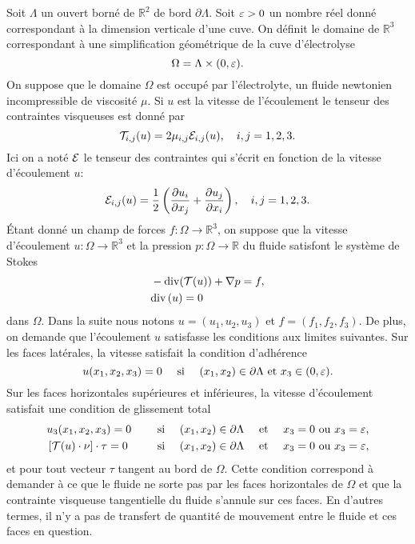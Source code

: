 Soit $\Lambda$ un ouvert borné de $\mathbb R^2$ de bord
$\partial\Lambda$. Soit $\varepsilon > 0$ un nombre réel donné
correspondant à la dimension verticale d'une cuve. On définit le
domaine de $\mathbb R^3$ correspondant à une simplification
géométrique de la cuve d'électrolyse
\begin{equation}
  \Omega = \Lambda \times (0,\varepsilon).
\end{equation}
On suppose que le domaine $\Omega$ est occupé par l'électrolyte, un
fluide newtonien incompressible de viscosité $\mu$. Si $u$ est la
vitesse de l'écoulement le tenseur des contraintes visqueuses
\cite{Landau1987} est donné par
\begin{equation}
  \mathcal T_{i,j}(u) = 2\mu_{i,j}
  \mathcal E_{i,j}(u),\quad i,j = 1,2,3.
\end{equation}
Ici on a noté $\mathcal E$ le tenseur des contraintes qui s'écrit
en fonction de la vitesse d'écoulement $u$:
\begin{equation}
  \mathcal E_{i,j}(u) = \frac{1}{2}\left( \frac{\partial u_i}{\partial x_j} + \frac{\partial u_j}{\partial x_i} \right),\quad i,j = 1,2,3.
\end{equation}
Étant donné un champ de forces $f:\Omega\to \mathbb R^3$, on suppose
que la vitesse d'écoulement $u:\Omega \to \mathbb R^3$ et la pression
$p:\Omega \to \mathbb R$ du fluide satisfont le système de Stokes
\begin{align}
  &- \mathrm{div}(\mathcal T(u)) + \nabla p = f,\label{eq:stokes-u}\\
  &\mathrm{div} \left( u \right) = 0\label{eq:stokes-p}
\end{align}
dans $\Omega$. Dans la suite nous notons $u = (u_1, u_2, u_3)$ et $f =
(f_1, f_2, f_3)$. De plus, on demande que l'écoulement $u$ satisfasse
les conditions aux limites suivantes. Sur les faces latérales, la
vitesse satisfait la condition d'adhérence
\begin{equation}
  u(x_1, x_2, x_3) = 0\quad \text{ si }\quad (x_1, x_2) \in \partial \Lambda%
  \text{ et } x_3\in(0, \thickness).\label{eq:stokes-bc-1}
\end{equation}
Sur les faces horizontales supérieures et inférieures, la vitesse
d'écoulement satisfait une condition de glissement total
\begin{align}
  &u_3(x_1, x_2, x_3) = 0&\quad \text{ si }\quad (x_1, x_2) \in \partial \Lambda%
  \quad\text{ et }\quad x_3 = 0 \text{ ou } x_3 = \thickness,\label{eq:stokes-bc-2}\\
  &\left[ \mathcal T(u)\cdot \nu \right]\cdot\tau = 0&\quad \text{ si }\quad (x_1, x_2) \in \partial \Lambda%
  \quad\text{ et }\quad x_3 = 0 \text{ ou } x_3 = \thickness,\label{eq:stokes-bc-3}
\end{align}
et pour tout vecteur $\tau$ tangent au bord de $\Omega$. Cette
condition correspond à demander à ce que le fluide ne sorte pas par les
faces horizontales de $\Omega$ et que la contrainte visqueuse tangentielle du
fluide s'annule sur ces faces. En d'autres termes, il n'y a pas de
transfert de quantité de mouvement entre le fluide et ces faces en question.

